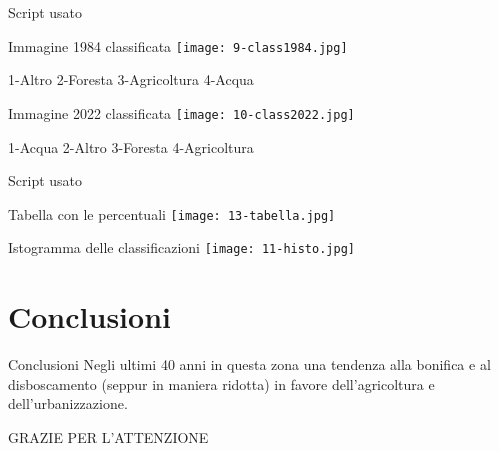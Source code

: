 \documentclass{beamer}
\begin{document}
\begin{frame}{Script usato}
    \begin{scriptsize}
        
    \end{scriptsize}
\end{frame}

\begin{frame}{Immagine 1984 classificata}
    \texttt{[image: 9-class1984.jpg]}
    \centering
    
    \medskip
    
1-Altro 2-Foresta 3-Agricoltura 4-Acqua
\end{frame}

\begin{frame}{Immagine 2022 classificata}
    \texttt{[image: 10-class2022.jpg]}
    \centering
    
    \medskip
    
    1-Acqua 2-Altro 3-Foresta 4-Agricoltura
\end{frame}

\begin{frame}{Script usato}
    \begin{tiny}
        
    \end{tiny}
\end{frame}

\begin{frame}{Tabella con le percentuali}
    \texttt{[image: 13-tabella.jpg]}
    \centering
\end{frame}

\begin{frame}{Istogramma delle classificazioni}
    \texttt{[image: 11-histo.jpg]}
    \centering
\end{frame}

\section{Conclusioni}

\begin{frame}{Conclusioni}
    Negli ultimi 40 anni in questa zona una tendenza alla bonifica e al disboscamento (seppur in maniera ridotta) in favore dell'agricoltura e dell'urbanizzazione. 
\end{frame}

\begin{frame}
\begin{Huge}
GRAZIE PER L'ATTENZIONE
\end{Huge}
\end{frame}
\end{document}
